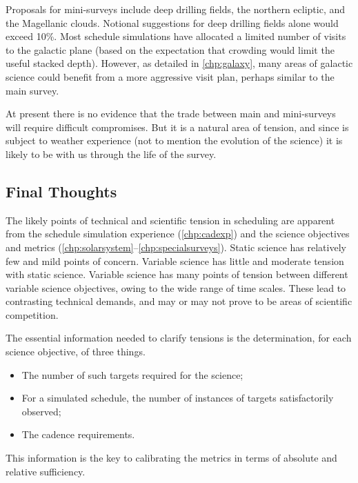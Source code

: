Proposals for mini-surveys include deep drilling fields, the northern
ecliptic, and the Magellanic clouds. Notional suggestions for deep
drilling fields alone would exceed 10\%.   Most schedule simulations
have allocated a limited number of visits to the galactic plane (based
on the expectation that crowding would limit the useful stacked depth).
However, as detailed in \autoref{chp:galaxy}, many areas of galactic
science could benefit from a more aggressive visit plan, perhaps similar
to the main survey.

At present there is no evidence that the trade between main and
mini-surveys will require difficult compromises.  But it is a natural
area of tension, and since is subject to weather experience (not to
mention the evolution of the science) it is likely to be with us through
the life of the survey.


\subsection{Final Thoughts}

The likely points of technical and scientific tension in scheduling are
apparent from the schedule simulation experience (\autoref{chp:cadexp})
and the science objectives and metrics
(\autoref{chp:solarsystem}--\autoref{chp:specialsurveys}).  Static
science has relatively few and mild points of concern.  Variable science
has little and moderate tension with static science.  Variable science
has many points of tension between different variable science
objectives, owing to the wide range of time scales. These lead to
contrasting technical demands, and may or may not prove to be areas of
scientific competition.

The essential information needed to clarify tensions is the
determination, for each science objective, of three things.
\begin{itemize}
	\item The number of such targets required for the science;
	\item For a simulated schedule, the number of instances of targets satisfactorily observed;
	\item The cadence requirements.
\end{itemize}
This information is the key to calibrating the metrics in terms of
absolute and relative  sufficiency.

